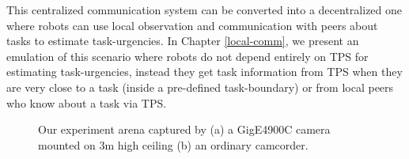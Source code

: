 \documentclass[final,5p,times,twocolumn]{elsarticle}
\begin{document}
This centralized communication system can be converted into a decentralized one where robots can use local observation and communication with peers about tasks to estimate task-urgencies. In Chapter \ref{local-comm}, we present an emulation of this scenario where robots do not depend entirely on TPS for estimating task-urgencies, instead they get task information from TPS when they are very close to a task (inside a pre-defined task-boundary) or from local peers who know about a task via TPS.
\begin{figure}
\centering
\hspace*{1cm}
\newline
{}
\caption{Our experiment arena captured by (a) a GigE4900C camera mounted on 3m high ceiling (b) an ordinary camcorder.}
\label{fig:expt-arena} %
\end{figure}
\end{document}
